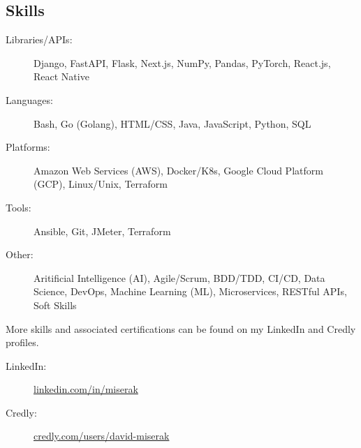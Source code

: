 \begin{samepage}
\section{Skills}
\label{sec:skills}

\begin{description}
	\item[Libraries/APIs:]
		Django,
		FastAPI,
		Flask,
		Next.js,
		NumPy,
		Pandas,
		PyTorch,
		React.js,
		React Native
	\item[Languages:]
		Bash,
		Go (Golang),
		HTML/CSS,
		Java,
		JavaScript,
		Python,
		SQL
	\item[Platforms:]
		Amazon Web Services (AWS),
		Docker/K8s,
		Google Cloud Platform (GCP),
		Linux/Unix,
		Terraform
	\item[Tools:]
		Ansible,
		Git,
		JMeter,
		Terraform

	\item[Other:]
		Aritificial Intelligence (AI),
		Agile/Scrum,
		BDD/TDD,
		CI/CD,
		Data Science,
		DevOps,
		Machine Learning (ML),
		Microservices,
		RESTful APIs,
		Soft Skills\\
\end{description}
%
	More skills and associated certifications can be found on my LinkedIn and Credly profiles.
\begin{description}
	\item[LinkedIn:] \href{https://www.linkedin.com/in/miserak/}{linkedin.com/in/miserak}
	\item[Credly:] \href{https://www.credly.com/users/david-miserak}{credly.com/users/david-miserak}
\end{description}
\end{samepage}
